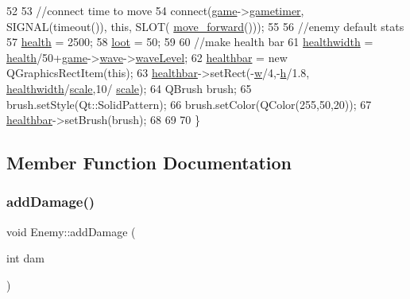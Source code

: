 \begin{DoxyCode}
52 
53     \textcolor{comment}{//connect time to move}
54     connect(\hyperlink{enemy_8cpp_a58bdb5643d0814ac4e697a1564b79b70}{game}->\hyperlink{class_game_a8feee9081542b15a9f2d889a6f1c8257}{gametimer}, SIGNAL(timeout()), \textcolor{keyword}{this}, SLOT(
      \hyperlink{class_enemy_afa4cb14cbeaf872456d223cb8a314928}{move\_forward}()));
55 
56     \textcolor{comment}{//enemy default stats}
57     \hyperlink{class_enemy_aedd5e7bf8ef07ee97be433c853a10d8d}{health} = 2500;
58     \hyperlink{class_enemy_a8f007e72b954c077e5433a111def78c3}{loot} = 50;
59 
60     \textcolor{comment}{//make health bar}
61     \hyperlink{class_enemy_aa5350ac40894832de19d669f0f65af4d}{healthwidth} = \hyperlink{class_enemy_aedd5e7bf8ef07ee97be433c853a10d8d}{health}/50+\hyperlink{enemy_8cpp_a58bdb5643d0814ac4e697a1564b79b70}{game}->\hyperlink{class_game_af9a4b49ad573785e961b29758c84fdd0}{wave}->\hyperlink{class_waves_abfdc18a5f2f185285173797c1c67c6f9}{waveLevel};
62     \hyperlink{class_enemy_ae2613608ff6c6d090a714874e722c340}{healthbar} = \textcolor{keyword}{new} QGraphicsRectItem(\textcolor{keyword}{this});
63     \hyperlink{class_enemy_ae2613608ff6c6d090a714874e722c340}{healthbar}->setRect(-\hyperlink{class_enemy_a259bfaab0f0d06c9ec2cb15c787e0b3a}{w}/4,-\hyperlink{class_enemy_adcb5512e63e735485cbb83f763acce75}{h}/1.8, \hyperlink{class_enemy_aa5350ac40894832de19d669f0f65af4d}{healthwidth}/\hyperlink{class_enemy_a5c11ea6afd7998cf74a6a73dc05d0a63}{scale},10/
      \hyperlink{class_enemy_a5c11ea6afd7998cf74a6a73dc05d0a63}{scale});
64     QBrush brush;
65     brush.setStyle(Qt::SolidPattern);
66     brush.setColor(QColor(255,50,20));
67     \hyperlink{class_enemy_ae2613608ff6c6d090a714874e722c340}{healthbar}->setBrush(brush);
68 
69 
70 \}
\end{DoxyCode}


\subsection{Member Function Documentation}
\mbox{\label{class_enemy_ac7a5e3a071bcc4d67300cfae9446e0bd}} 
\subsubsection{\texorpdfstring{add\+Damage()}{addDamage()}}
{\footnotesize\ttfamily void Enemy\+::add\+Damage (\begin{DoxyParamCaption}\item[{int}]{dam }\end{DoxyParamCaption})}



